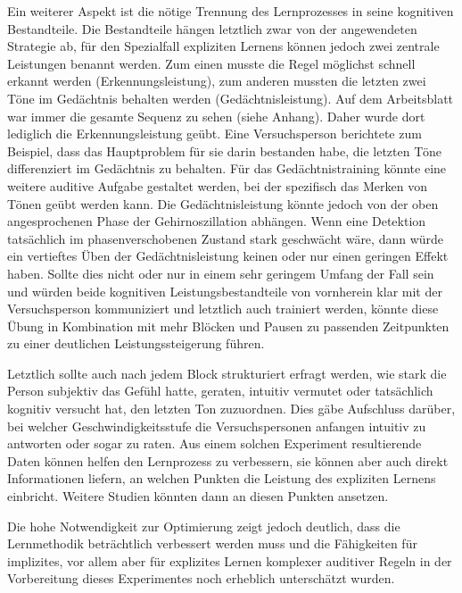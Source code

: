 \documentclass[doc,a4paper,12pt]{apa6}
\begin{document}
Ein weiterer Aspekt ist die nötige Trennung des Lernprozesses in seine kognitiven Bestandteile. Die Bestandteile hängen letztlich zwar von der angewendeten Strategie ab, für den Spezialfall expliziten Lernens können jedoch zwei zentrale Leistungen benannt werden. Zum einen musste die Regel möglichst schnell erkannt werden (Erkennungsleistung), zum anderen mussten die letzten zwei Töne im Gedächtnis behalten werden (Gedächtnisleistung). Auf dem Arbeitsblatt war immer die gesamte Sequenz zu sehen (siehe Anhang). Daher wurde dort lediglich die Erkennungsleistung geübt. Eine Versuchsperson berichtete zum Beispiel, dass das Hauptproblem für sie darin bestanden habe, die letzten Töne differenziert im Gedächtnis zu behalten. Für das Gedächtnistraining könnte eine weitere auditive Aufgabe gestaltet werden, bei der spezifisch das Merken von Tönen geübt werden kann. Die Gedächtnisleistung könnte jedoch von der oben angesprochenen Phase der Gehirnoszillation abhängen. Wenn eine Detektion tatsächlich im phasenverschobenen Zustand stark geschwächt wäre, dann würde ein vertieftes Üben der Gedächtnisleistung keinen oder nur einen geringen Effekt haben. Sollte dies nicht oder nur in einem sehr geringem Umfang der Fall sein und würden beide kognitiven Leistungsbestandteile von vornherein klar mit der Versuchsperson kommuniziert und letztlich auch trainiert werden, könnte diese Übung in Kombination mit mehr Blöcken und Pausen zu passenden Zeitpunkten zu einer deutlichen Leistungssteigerung führen.

Letztlich sollte auch nach jedem Block strukturiert erfragt werden, wie stark die Person subjektiv das Gefühl hatte, geraten, intuitiv vermutet oder tatsächlich kognitiv versucht hat, den letzten Ton zuzuordnen. Dies gäbe Aufschluss darüber, bei welcher Geschwindigkeitsstufe die Versuchspersonen anfangen intuitiv zu antworten oder sogar zu raten. Aus einem solchen Experiment resultierende Daten können helfen den Lernprozess zu verbessern, sie können aber auch direkt Informationen liefern, an welchen Punkten die Leistung des expliziten Lernens einbricht. Weitere Studien könnten dann an diesen Punkten ansetzen.

Die hohe Notwendigkeit zur Optimierung zeigt jedoch deutlich, dass die Lernmethodik beträchtlich verbessert werden muss und die Fähigkeiten für implizites, vor allem aber für explizites Lernen komplexer auditiver Regeln in der Vorbereitung dieses Experimentes noch erheblich unterschätzt wurden.

\end{document}
